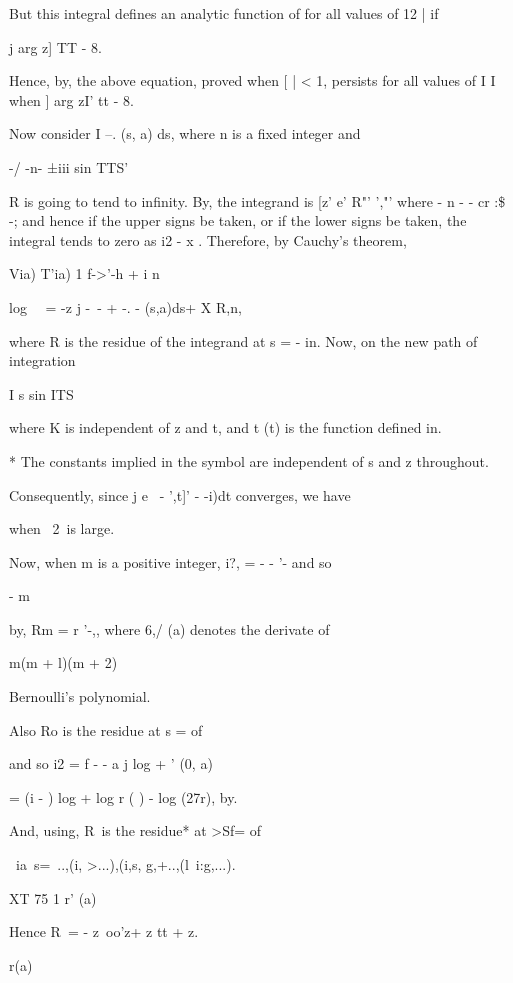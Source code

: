 {{But this integral defines an analytic function of for all values of 12
| if

j arg z] TT - 8.

Hence, by, the above equation, proved when [ | < 1, persists for
all values of I I when ] arg zI' tt - 8.

Now consider I --. (s, a) ds, where n is a fixed integer and

-/ -n- ±iii sin TTS'

R is going to tend to infinity. By, the integrand is [z' e'
R"' ',"' where - n - - cr :\$ -; and hence if the upper signs be
taken, or if the lower signs be taken, the integral tends to zero as
i2 - x . Therefore, by Cauchy's theorem,

Via) T'ia) 1 f->'-h + i n

log \ \ = -z j -~- + -. - (s,a)ds+ X R,n,

where R is the residue of the integrand at s = - in. Now, on the new
path of integration

I s sin ITS \

where K is independent of z and t, and t (t) is the function defined
in.

* The constants implied in the symbol are independent of s and z
throughout.

%
%

Consequently, since j e~ - ',t]' - -i)dt converges, we have

when \ 2\ is large.

Now, when m is a positive integer, i?, = - - '- and so

- m

by, Rm = r '-,, where 6,/ (a) denotes the derivate of

m(m + l)(m + 2)

Bernoulli's polynomial.

Also Ro is the residue at s = of

and so i2 = f - - a j log + ' (0, a)

= (i - ) log + log r ( ) - log (27r), by.

And, using, R\, is the residue* at >Sf= of

\ ia\ s=\ ..,(i, >...),(i,s, g,+..,(l\ i:g,...).

XT 75 1 r' (a)

Hence R\ = - z\ oo'z+ z tt + z.

r(a)

}}

